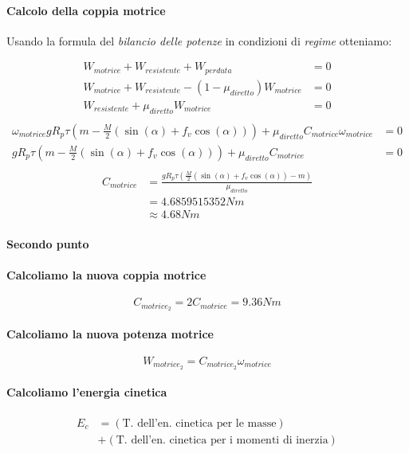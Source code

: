 \documentclass[main.tex]{subfiles}
\begin{document}
\paragraph{Calcolo della coppia motrice} Usando la formula del \textit{bilancio delle potenze} in condizioni di \textit{regime} otteniamo:

\begin{align*}
  W_{motrice} + W_{resistente} + W_{perduta} &= 0 \\
  W_{motrice} + W_{resistente} -(1 - \mu_{diretto})W_{motrice} &= 0 \\
  W_{resistente} + \mu_{diretto}W_{motrice} &= 0 \\
\end{align*}
\begin{align*}
  \omega_{motrice}gR_p\tau(m -\frac{M}{2}(\sin(\alpha) + f_v\cos(\alpha))) + \mu_{diretto}C_{motrice}\omega_{motrice} &= 0 \\
  gR_p\tau(m -\frac{M}{2}(\sin(\alpha) + f_v\cos(\alpha))) + \mu_{diretto}C_{motrice} &= 0 \\
\end{align*}
\begin{align*}
  C_{motrice} &= \frac{gR_p\tau(\frac{M}{2}(\sin(\alpha) + f_v\cos(\alpha)) - m)}{\mu_{diretto}} \\
  &= 4.6859515352 Nm \\
  &\approx 4.68 Nm
\end{align*}

\paragraph{Secondo punto}

\paragraph{Calcoliamo la nuova coppia motrice}
\[
  C_{motrice_2} = 2C_{motrice} = 9.36Nm
\]

\paragraph{Calcoliamo la nuova potenza motrice}
\[
  W_{motrice_2} = C_{motrice_2}\omega_{motrice}
\]

\paragraph{Calcoliamo l'energia cinetica}

\begin{align*}
  E_c &= (\text{T. dell'en. cinetica per le masse})\\ &+ (\text{T. dell'en. cinetica per i momenti di inerzia})
\end{align*}
\end{document}
